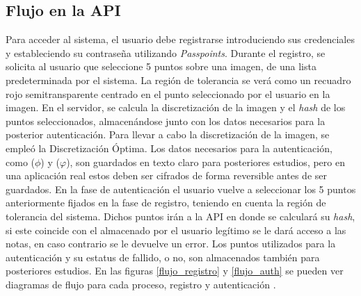 \subsection{Flujo en la API}
Para acceder al sistema, el usuario debe registrarse introduciendo sus credenciales y estableciendo su contraseña utilizando \textit{Passpoints}. Durante el registro, se solicita al usuario que seleccione 5 puntos sobre una imagen, de una lista predeterminada por el sistema. La regi\'on de tolerancia se ver\'a como un recuadro rojo semitransparente centrado en el punto seleccionado por el usuario en la imagen. En el servidor, se calcula la discretización de la imagen y el \textit{hash} de los puntos seleccionados, almacenándose junto con los datos necesarios para la posterior autenticación. Para llevar a cabo la discretización de la imagen, se empleó la Discretización Óptima. Los datos necesarios para la autenticación, como  ($\phi$) y ($\varphi$), son guardados en texto claro para posteriores estudios, pero en una aplicaci\'on real estos deben ser cifrados de forma reversible antes de ser guardados. En la fase de autenticaci\'on el usuario vuelve a seleccionar los 5 puntos anteriormente fijados en la fase de registro, teniendo en cuenta la regi\'on de tolerancia del sistema. Dichos puntos ir\'an a la API en donde se calcular\'a su \textit{hash}, si este coincide con el almacenado por el usuario leg\'itimo se le dar\'a acceso a las notas, en caso contrario se le devuelve un error. Los puntos utilizados para la autenticaci\'on y su estatus de fallido, o no, son almacenados tambi\'en para posteriores estudios. En las figuras \ref{flujo_registro} y \ref{flujo_auth} se pueden ver diagramas de flujo para cada proceso, registro y  autenticaci\'on .

